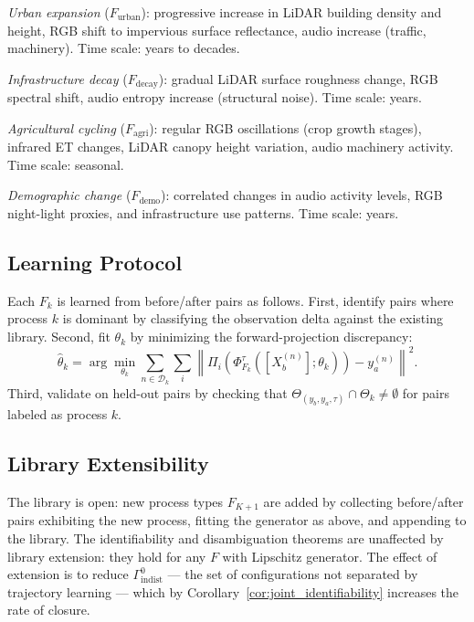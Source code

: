 \documentclass[11pt, oneside]{article}
\begin{document}
\emph{Urban expansion} ($F_{\mathrm{urban}}$): progressive increase in LiDAR building
density and height, RGB shift to impervious surface reflectance, audio increase (traffic,
machinery). Time scale: years to decades.

\emph{Infrastructure decay} ($F_{\mathrm{decay}}$): gradual LiDAR surface roughness
change, RGB spectral shift, audio entropy increase (structural noise). Time scale: years.

\emph{Agricultural cycling} ($F_{\mathrm{agri}}$): regular RGB oscillations (crop growth
stages), infrared ET changes, LiDAR canopy height variation, audio machinery activity.
Time scale: seasonal.

\emph{Demographic change} ($F_{\mathrm{demo}}$): correlated changes in audio activity
levels, RGB night-light proxies, and infrastructure use patterns. Time scale: years.

\subsection{Learning Protocol}

Each $F_k$ is learned from before/after pairs as follows. First, identify pairs where
process $k$ is dominant by classifying the observation delta against the existing library.
Second, fit $\theta_k$ by minimizing the forward-projection discrepancy:
\[
\hat{\theta}_k = \arg\min_{\theta_k} \sum_{n \in \mathcal{D}_k} \sum_i
\left\|\Pi_i(\Phi^\tau_{F_k}([X_b^{(n)}];\theta_k)) - y_a^{(n)}\right\|^2.
\]
Third, validate on held-out pairs by checking that
$\Theta_{(y_b,y_a,\tau)} \cap \Theta_k \ne \emptyset$ for pairs labeled as process $k$.

\subsection{Library Extensibility}

The library is open: new process types $F_{K+1}$ are added by collecting before/after
pairs exhibiting the new process, fitting the generator as above, and appending to the
library. The identifiability and disambiguation theorems are unaffected by library
extension: they hold for any $F$ with Lipschitz generator. The effect of extension is to
reduce $\Gamma^0_{\mathrm{indist}}$ --- the set of configurations not separated by
trajectory learning --- which by Corollary~\ref{cor:joint_identifiability} increases the
rate of closure.

\end{document}
